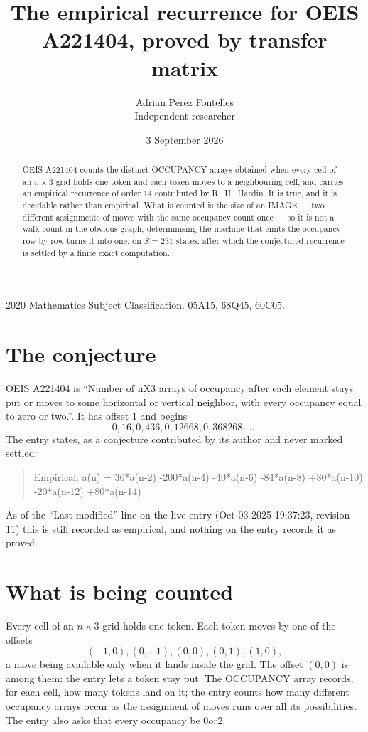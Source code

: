 \documentclass[11pt,a4paper]{article}
\title{The empirical recurrence for OEIS A221404, proved by transfer matrix}
\author{Adrian Perez Fontelles\\ \small Independent researcher}
\date{3 September 2026}
\theoremstyle{plain}
\theoremstyle{definition}
\begin{document}
\maketitle

\begin{abstract}
OEIS A221404 counts the distinct OCCUPANCY arrays obtained when every cell of an $n\times3$ grid
holds one token and each token moves to a neighbouring cell, and carries an empirical
recurrence of order $14$ contributed by R.~H.~Hardin. It is true, and it is decidable
rather than empirical. What is counted is the size of an IMAGE --- two different assignments of
moves with the same occupancy count once --- so it is not a walk count in the obvious graph;
determinising the machine that emits the occupancy row by row turns it into one, on $S=231$
states, after which the conjectured recurrence is settled by a finite exact computation.
\end{abstract}

\noindent\small 2020 Mathematics Subject Classification. 05A15, 68Q45, 60C05.\normalsize

\section{The conjecture}

OEIS A221404 is ``Number of nX3 arrays of occupancy after each element stays put or moves to some horizontal or vertical neighbor, with every occupancy equal to zero or two.''. It has offset $1$ and begins
\[
0, 16, 0, 436, 0, 12668, 0, 368268,\ \dots
\]
The entry states, as a conjecture contributed by its author and never marked settled:
\begin{quote}
Empirical: a(n) = 36*a(n-2) -200*a(n-4) -40*a(n-6) -84*a(n-8) +80*a(n-10) -20*a(n-12) +80*a(n-14)
\end{quote}
As of the ``Last modified'' line on the live entry (Oct 03 2025 19:37:23, revision 11) this is still
recorded as empirical, and nothing on the entry records it as proved.

\section{What is being counted}

Every cell of an $n\times3$ grid holds one token. Each token moves by one of the offsets
\[
(-1,0), (0,-1), (0,0), (0,1), (1,0),
\]
a move being available only when it lands inside the grid. The offset $(0,0)$ is among them: the entry lets a token stay put. The OCCUPANCY array
records, for each cell, how many tokens land on it; the entry counts how many different
occupancy arrays occur as the assignment of moves runs over all its possibilities. The entry also asks that every occupancy be $0 or 2$.
\end{document}
